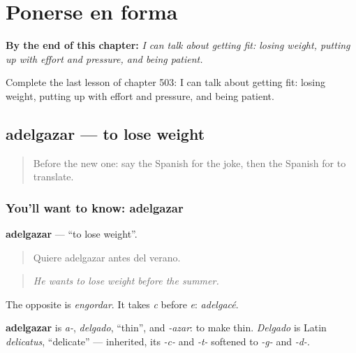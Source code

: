 
\chapter{Ponerse en forma}
\label{ch:es-ponerse-en-forma}

\begin{chapteropening}
\textbf{By the end of this chapter:} \emph{I can talk about getting fit: losing weight, putting up with effort and pressure, and being patient.}

Complete the last lesson of chapter 503: I can talk about getting fit: losing weight, putting up with effort and pressure, and being patient.
\end{chapteropening}

\section[adelgazar]{adelgazar — to lose weight}

\label{lesson:ES-C503-adelgazar}



\begin{quote}
Before the new one: say the Spanish for the joke, then the Spanish for to translate.
\end{quote}

\subsection*{You'll want to know: adelgazar}
\textbf{adelgazar} — \textquotedblleft{}to lose weight\textquotedblright{}.

\begin{quote}
Quiere adelgazar antes del verano.
\end{quote}

\begin{quote}
\emph{He wants to lose weight before the summer.}
\end{quote}

The opposite is \emph{engordar}. It takes \emph{c} before \emph{e}: \emph{adelgacé}.

\begin{cousinweb}
\textbf{adelgazar} is \emph{a-}, \emph{delgado}, \textquotedblleft{}thin\textquotedblright{}, and \emph{-azar}: to make thin. \emph{Delgado} is Latin \emph{delicatus}, \textquotedblleft{}delicate\textquotedblright{} — inherited, its \emph{-c-} and \emph{-t-} softened to \emph{-g-} and \emph{-d-}.
\end{cousinweb}

